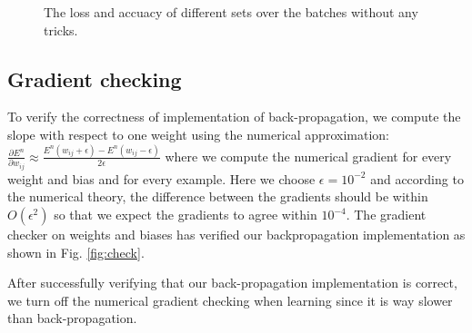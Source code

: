 \documentclass{article} %
\begin{document}
\begin{figure} [!htbp]
	
	\caption{The loss and accuacy of different sets over the batches without any tricks. }  
	
\end{figure}

\subsection{Gradient checking}
To verify the correctness of implementation of back-propagation, we compute the slope with respect to one weight using the numerical approximation: $\frac{\partial E^{n}}{\partial w_{ij}} \approx \frac{E^{n}(w_{ij}+\epsilon)-E^{n}(w_{ij}-\epsilon)}{2\epsilon}$ where we compute the numerical gradient for every weight and bias and for every example. Here we choose $\epsilon = 10^{-2}$ and according to the numerical theory, the difference between the gradients should be within $O(\epsilon^{2})$ so that we expect the gradients to agree within $10^{-4}$. The gradient checker on weights and biases has verified our backpropagation implementation as shown in Fig. \ref{fig:check}.

After successfully verifying that our back-propagation implementation is correct, we turn off the numerical gradient checking when learning since it is way slower than back-propagation.
\end{document}
